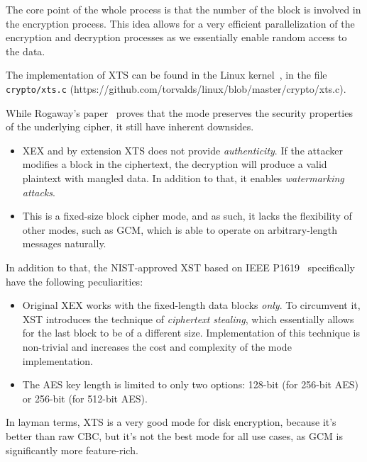 The core point of the whole process is that the number of the block is involved in the encryption process.
This idea allows for a very efficient parallelization of the encryption and decryption processes as we essentially enable random access to the data.

The implementation of XTS can be found in the Linux kernel~\cite{linux-kernel}, in the file \texttt{crypto/xts.c} (https://github.com/torvalds/linux/blob/master/crypto/xts.c).

While Rogaway's paper~\cite{Rogaway} proves that the mode preserves the security properties of the underlying cipher, it still have inherent downsides.

\begin{itemize}
    \item XEX and by extension XTS does not provide \textit{authenticity}. If the attacker modifies a block in the ciphertext, the decryption will produce a valid plaintext with mangled data. In addition to that, it enables \textit{watermarking attacks}.
    \item This is a fixed-size block cipher mode, and as such, it lacks the flexibility of other modes, such as GCM, which is able to operate on arbitrary-length messages naturally.
\end{itemize}

In addition to that, the NIST-approved XST based on IEEE P1619~\cite{IEEE1619} specifically have the following peculiarities:
\begin{itemize}
    \item Original XEX works with the fixed-length data blocks \textit{only}.
    To circumvent it, XST introduces the technique of \textit{ciphertext stealing}, which essentially allows for the last block to be of a different size.
    Implementation of this technique is non-trivial and increases the cost and complexity of the mode implementation.
    \item The AES key length is limited to only two options: 128-bit (for 256-bit AES) or 256-bit (for 512-bit AES).
\end{itemize}

In layman terms, XTS is a very good mode for disk encryption, because it's better than raw CBC, but it's not the best mode for all use cases, as GCM is significantly more feature-rich.
